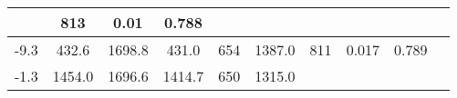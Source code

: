 \documentclass[a4paper,10pt]{article}
\begin{document}
\begin{longtable}{
     |
%    
    c|
%    
    c|
%    
    c|
%    
    c|
%    
    c|
%    
    c|
%    
    c|
%    
    c|
%    
    c|
%    
    c|
%    
    }
%        
        & 813
%        

%        

%        
        & 0.01
%        

%        

%        
        & 0.788
%        

%        
        \\
        \hline

        

%        

%        
        -9.3
%        

%        

%        
        & 432.6
%        

%        

%        
        & 1698.8
%        

%        

%        
        & 431.0
%        

%        

%        
        & 654
%        

%        

%        
        & 1387.0
%        

%        

%        
        & 811
%        

%        

%        
        & 0.017
%        

%        

%        
        & 0.789
%        

%        
        \\
        \hline

        

%        

%        
        -1.3
%        

%        

%        
        & 1454.0
%        

%        

%        
        & 1696.6
%        

%        

%        
        & 1414.7
%        

%        

%        
        & 650
%        

%        

%        
        & 1315.0
%        

%        


\end{longtable}
\end{document}
